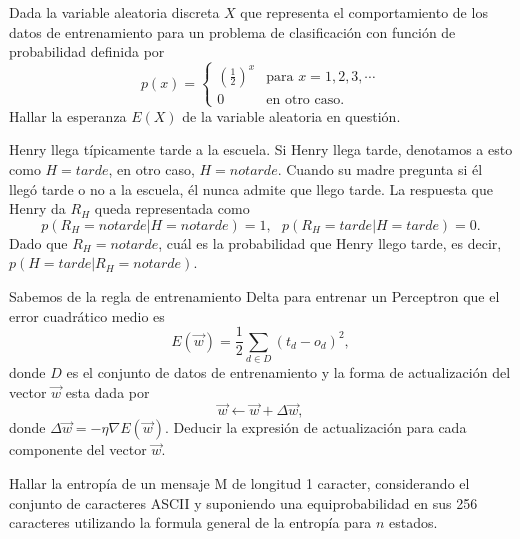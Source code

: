 \documentclass[12pt]{exam}
\begin{document}
\begin{questions}

\question[4] Dada la variable aleatoria discreta $X$ que representa el comportamiento de los datos de entrenamiento para un problema de clasificaci\'on con funci\'on de probabilidad definida por
\begin{equation*}
p(x)=\begin{cases} 
      (\frac{1}{2})^x & \text{para } x=1,2,3,\cdots\\
      0 & \text{en otro caso.}
   \end{cases}
\end{equation*}
Hallar la esperanza $E(X)$ de la variable aleatoria en questi\'on.
\addpoints

\question[4] Henry llega t\'ipicamente tarde a la escuela. Si Henry llega tarde, denotamos a esto como $H=tarde$, en otro caso, $H=no tarde$. Cuando su madre pregunta si \'el lleg\'o tarde o no a la escuela, \'el nunca admite que llego tarde. La respuesta que Henry da $R_{H}$ queda representada como
\begin{equation*}
p(R_{H}=no tarde|H=no tarde)=1,\,\,\,\,p(R_{H}=tarde|H=tarde)=0.
\end{equation*}
Dado que $R_{H}=no tarde$, cu\'al es la probabilidad que Henry llego tarde, es decir, $p(H=tarde|R_{H}=no tarde)$.
\addpoints

\question[3] Sabemos de la regla de entrenamiento Delta para entrenar un Perceptron que el error cuadr\'atico medio es
\begin{equation*}
	E(\vec{w})=\frac{1}{2}\displaystyle\sum_{d\in D}(t_d-o_d)^2,
\end{equation*}
donde $D$ es el conjunto de datos de entrenamiento y la forma de actualizaci\'on del vector $\vec{w}$ esta dada por
\begin{equation*}
	\vec{w}\leftarrow \vec{w}+\Delta\vec{w},
\end{equation*}
donde $\Delta\vec{w}=-\eta\nabla E(\vec{w})$. Deducir la expresi\'on de actualizaci\'on para cada componente del vector $\vec{w}$.
\addpoints

\question[2] Hallar la entrop\'ia de un mensaje M de longitud 1 caracter, considerando el conjunto de caracteres ASCII y suponiendo una equiprobabilidad en sus 256 caracteres utilizando la formula general de la entrop\'ia para $n$ estados.
\addpoints


\end{questions}
\end{document}
